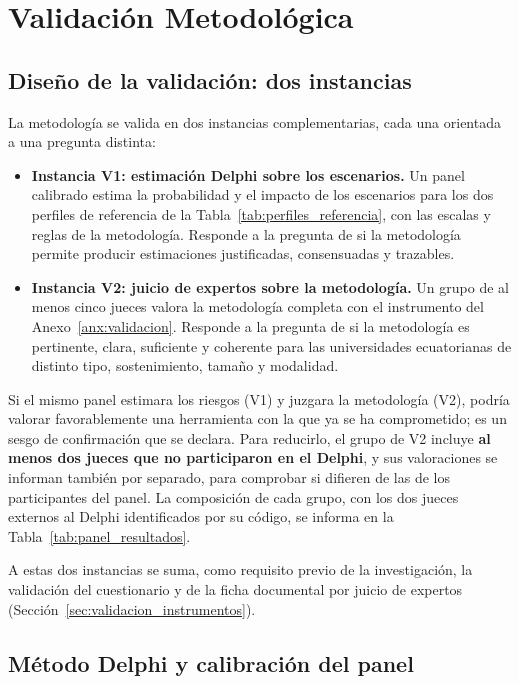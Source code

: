 \section{Validación Metodológica}
\label{sec:validacion_metodologica}

\subsection{Diseño de la validación: dos instancias}

La metodología se valida en dos instancias complementarias, cada una orientada a una pregunta distinta:

\begin{itemize}
  \item \textbf{Instancia V1: estimación Delphi sobre los escenarios.} Un panel calibrado estima la probabilidad y el impacto de los escenarios para los dos perfiles de referencia de la Tabla~\ref{tab:perfiles_referencia}, con las escalas y reglas de la metodología. Responde a la pregunta de si la metodología permite producir estimaciones justificadas, consensuadas y trazables.
  \item \textbf{Instancia V2: juicio de expertos sobre la metodología.} Un grupo de al menos cinco jueces valora la metodología completa con el instrumento del Anexo~\ref{anx:validacion}. Responde a la pregunta de si la metodología es pertinente, clara, suficiente y coherente para las universidades ecuatorianas de distinto tipo, sostenimiento, tamaño y modalidad.
\end{itemize}

Si el mismo panel estimara los riesgos (V1) y juzgara la metodología (V2), podría valorar favorablemente una herramienta con la que ya se ha comprometido; es un sesgo de confirmación que se declara. Para reducirlo, el grupo de V2 incluye \textbf{al menos dos jueces que no participaron en el Delphi}, y sus valoraciones se informan también por separado, para comprobar si difieren de las de los participantes del panel. La composición de cada grupo, con los dos jueces externos al Delphi identificados por su código, se informa en la Tabla~\ref{tab:panel_resultados}.

A estas dos instancias se suma, como requisito previo de la investigación, la validación del cuestionario y de la ficha documental por juicio de expertos (Sección~\ref{sec:validacion_instrumentos}).

\subsection{Método Delphi y calibración del panel}

